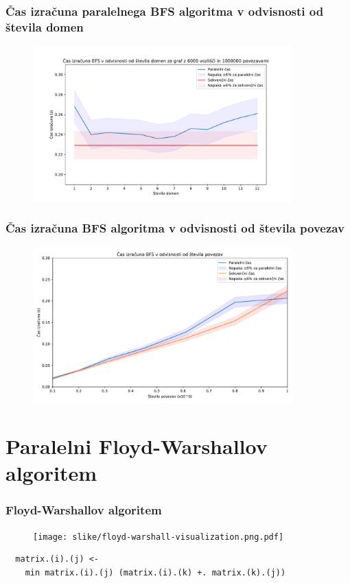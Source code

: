 \documentclass{beamer}
\begin{document}
\begin{frame}
  \frametitle{Čas izračuna paralelnega BFS algoritma v odvisnosti od števila domen}
  \begin{figure}
    \centering
    \includegraphics[width=10cm]{slike/bfs_v_odvisnosti_od_stevila_domen.pdf}
  \end{figure}
  
\end{frame}

\begin{frame}
  \frametitle{Čas izračuna BFS algoritma v odvisnosti od števila povezav}
  \begin{figure}
    \centering
    \includegraphics[width=10cm]{slike/bfs_v_odvisnosti_od_velikosti_grafa.pdf}
  \end{figure}
  
\end{frame}

\section{Paralelni Floyd-Warshallov algoritem}

\begin{frame}[fragile,t]
  \frametitle{Floyd-Warshallov algoritem}

  
  \begin{figure}[!ht]
    \texttt{[image: slike/floyd-warshall-visualization.png.pdf]}
  \end{figure}
  \begin{verbatim}
  matrix.(i).(j) <-
    min matrix.(i).(j) (matrix.(i).(k) +. matrix.(k).(j))
  \end{verbatim}
\end{frame}
\end{document}
